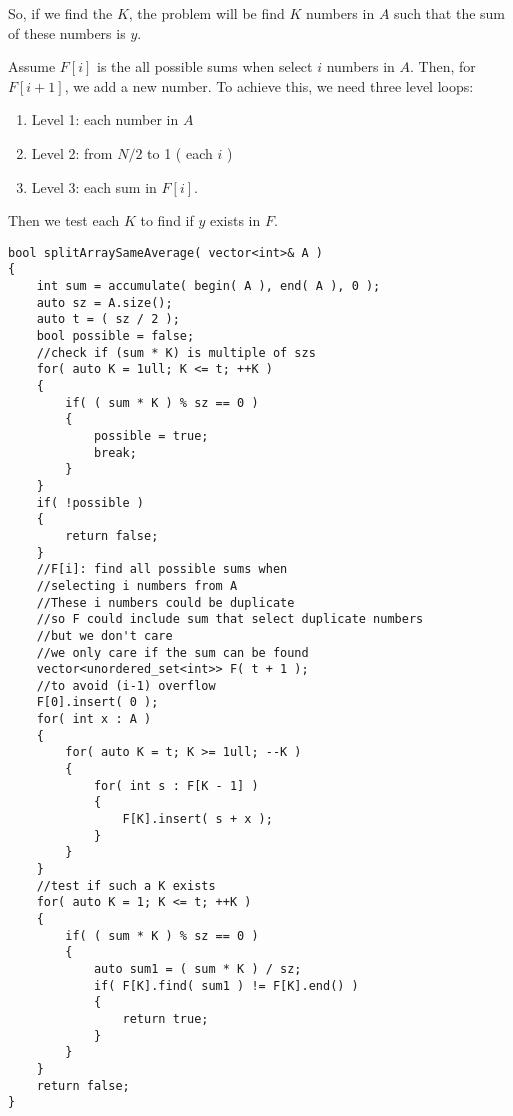 So, if we find the $K$, the problem will be find $K$ numbers in $A$ such that the sum of these numbers is $y$.

Assume $F[i]$ is the all possible sums when select $i$ numbers in $A$. Then, for $F[i+1]$, we add a new number. To achieve this, we need three level loops:

\begin{enumerate}
\item Level 1: each number in $A$
\item Level 2: from $N/2$ to 1 ( each $i$ )
\item Level 3: each sum in $F[i]$.
\end{enumerate}

Then we test each $K$ to find if $y$ exists in $F$.

\setcounter{lstlisting}{0}
\begin{lstlisting}[style=customc, caption={DP}]
bool splitArraySameAverage( vector<int>& A )
{
    int sum = accumulate( begin( A ), end( A ), 0 );
    auto sz = A.size();
    auto t = ( sz / 2 );
    bool possible = false;
    //check if (sum * K) is multiple of szs
    for( auto K = 1ull; K <= t; ++K )
    {
        if( ( sum * K ) % sz == 0 )
        {
            possible = true;
            break;
        }
    }
    if( !possible )
    {
        return false;
    }
    //F[i]: find all possible sums when
    //selecting i numbers from A
    //These i numbers could be duplicate
    //so F could include sum that select duplicate numbers
    //but we don't care
    //we only care if the sum can be found
    vector<unordered_set<int>> F( t + 1 );
    //to avoid (i-1) overflow
    F[0].insert( 0 );
    for( int x : A )
    {
        for( auto K = t; K >= 1ull; --K )
        {
            for( int s : F[K - 1] )
            {
                F[K].insert( s + x );
            }
        }
    }
    //test if such a K exists
    for( auto K = 1; K <= t; ++K )
    {
        if( ( sum * K ) % sz == 0 )
        {
            auto sum1 = ( sum * K ) / sz;
            if( F[K].find( sum1 ) != F[K].end() )
            {
                return true;
            }
        }
    }
    return false;
}
\end{lstlisting}
